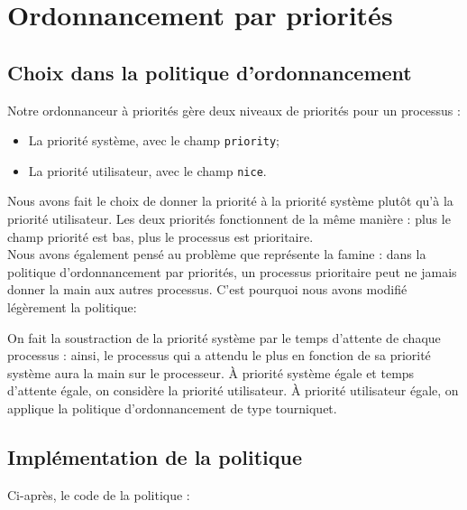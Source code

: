 \section{Ordonnancement par priorités}

\subsection{Choix dans la politique d'ordonnancement}

Notre ordonnanceur à priorités gère deux niveaux de priorités pour un processus :

\begin{itemize}
	\item La priorité système, avec le champ \texttt{priority};
	\item La priorité utilisateur, avec le champ \texttt{nice}.
\end{itemize}

Nous avons fait le choix de donner la priorité à la priorité système plutôt qu'à la priorité utilisateur.
Les deux priorités fonctionnent de la même manière : plus le champ priorité est bas, plus le processus est prioritaire.
\\

Nous avons également pensé au problème que représente la famine : dans la politique d'ordonnancement par priorités, un processus prioritaire peut ne jamais donner la main aux autres processus.
C'est pourquoi nous avons modifié légèrement la politique:

On fait la soustraction de la priorité système par le temps d'attente de chaque processus : ainsi, le processus qui a attendu le plus en fonction de sa priorité système aura la main sur le processeur.
À priorité système égale et temps d'attente égale, on considère la priorité utilisateur.
À priorité utilisateur égale, on applique la politique d'ordonnancement de type tourniquet.
\\

\subsection{Implémentation de la politique}

Ci-après, le code de la politique :


